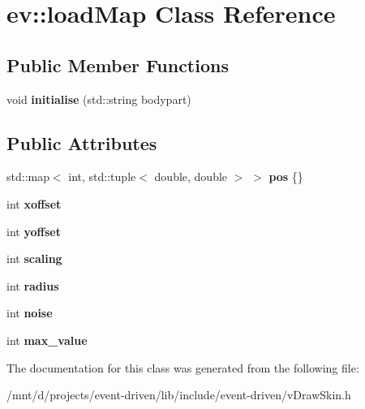\hypertarget{classev_1_1loadMap}{}\section{ev\+:\+:load\+Map Class Reference}
\label{classev_1_1loadMap}
\subsection*{Public Member Functions}
\begin{DoxyCompactItemize}
\item 
\mbox{\label{classev_1_1loadMap_a098c0c61861210b6b3c4090f21b332e7}} 
void {\bfseries initialise} (std\+::string bodypart)
\end{DoxyCompactItemize}
\subsection*{Public Attributes}
\begin{DoxyCompactItemize}
\item 
\mbox{\label{classev_1_1loadMap_a20d2b8bb1d0911574a906c0e43740b04}} 
std\+::map$<$ int, std\+::tuple$<$ double, double $>$ $>$ {\bfseries pos} \{\}
\item 
\mbox{\label{classev_1_1loadMap_aa08bacf603bd8996c10dd297fb2f0f1c}} 
int {\bfseries xoffset}
\item 
\mbox{\label{classev_1_1loadMap_a79e696c26e0a6428ce03270daef22f5d}} 
int {\bfseries yoffset}
\item 
\mbox{\label{classev_1_1loadMap_a57681d7ce3522f2b8a10e466fb575e0f}} 
int {\bfseries scaling}
\item 
\mbox{\label{classev_1_1loadMap_aef687a2418d6552d8524f69b2a8ce573}} 
int {\bfseries radius}
\item 
\mbox{\label{classev_1_1loadMap_ab1f79cba70449cd5da4015a4ef4133d3}} 
int {\bfseries noise}
\item 
\mbox{\label{classev_1_1loadMap_ad23b62a02b133aa935e30e6c5e75abf7}} 
int {\bfseries max\+\_\+value}
\end{DoxyCompactItemize}


The documentation for this class was generated from the following file\+:\begin{DoxyCompactItemize}
\item 
/mnt/d/projects/event-\/driven/lib/include/event-\/driven/v\+Draw\+Skin.\+h\end{DoxyCompactItemize}

